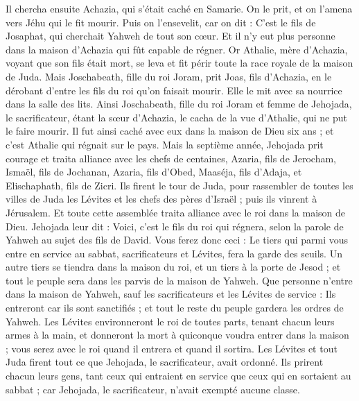 \begin{multicols}{2}
Il chercha ensuite Achazia, qui s'était caché en Samarie. On le prit, et on l'amena vers Jéhu qui le fit mourir. Puis on l'ensevelit, car on dit : C'est le fils de Josaphat, qui cherchait Yahweh de tout son cœur. Et il n'y eut plus personne dans la maison d'Achazia qui fût capable de régner.
Or Athalie, mère d'Achazia, voyant que son fils était mort, se leva et fit périr toute la race royale de la maison de Juda.
Mais Joschabeath, fille du roi Joram, prit Joas, fils d'Achazia, en le dérobant d'entre les fils du roi qu'on faisait mourir. Elle le mit avec sa nourrice dans la salle des lits. Ainsi Joschabeath, fille du roi Joram et femme de Jehojada, le sacrificateur, étant la sœur d'Achazia, le cacha de la vue d'Athalie, qui ne put le faire mourir.
Il fut ainsi caché avec eux dans la maison de Dieu six ans ; et c'est Athalie qui régnait sur le pays.
\VerseOne{}Mais la septième année, Jehojada prit courage et traita alliance avec les chefs de centaines, Azaria, fils de Jerocham, Ismaël, fils de Jochanan, Azaria, fils d'Obed, Maaséja, fils d'Adaja, et Elischaphath, fils de Zicri.
Ils firent le tour de Juda, pour rassembler de toutes les villes de Juda les Lévites et les chefs des pères d'Israël ; puis ils vinrent à Jérusalem.
Et toute cette assemblée traita alliance avec le roi dans la maison de Dieu. Jehojada leur dit : Voici, c'est le fils du roi qui régnera, selon la parole de Yahweh au sujet des fils de David.
Vous ferez donc ceci : Le tiers qui parmi vous entre en service au sabbat, sacrificateurs et Lévites, fera la garde des seuils.
Un autre tiers se tiendra dans la maison du roi, et un tiers à la porte de Jesod ; et tout le peuple sera dans les parvis de la maison de Yahweh.
Que personne n'entre dans la maison de Yahweh, sauf les sacrificateurs et les Lévites de service : Ils entreront car ils sont sanctifiés ; et tout le reste du peuple gardera les ordres de Yahweh.
Les Lévites environneront le roi de toutes parts, tenant chacun leurs armes à la main, et donneront la mort à quiconque voudra entrer dans la maison ; vous serez avec le roi quand il entrera et quand il sortira.
Les Lévites et tout Juda firent tout ce que Jehojada, le sacrificateur, avait ordonné. Ils prirent chacun leurs gens, tant ceux qui entraient en service que ceux qui en sortaient au sabbat ; car Jehojada, le sacrificateur, n'avait exempté aucune classe.

\end{multicols}
